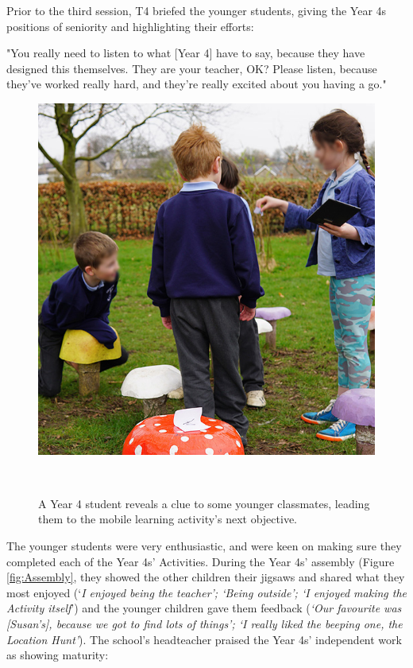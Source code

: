 Prior to the third session, T4 briefed the younger students, giving the Year 4s positions of seniority and highlighting their efforts:

\begin{displayquote}
"You really need to listen to what [Year 4] have to say, because they have designed this themselves. They are your teacher, OK? Please listen, because they've worked really hard, and they're really excited about you having a go."
\end{displayquote}

\begin{figure}
\centering
  \includegraphics[width=0.66\columnwidth]{images/chapter08/mushrooms.jpg}
  \caption[Year 4 students using OurPlace]{A Year 4 student reveals a clue to some younger classmates, leading them to the mobile learning activity's next objective. }~\label{fig:Mushrooms}
\end{figure}

The younger students were very enthusiastic, and were keen on making sure they completed each of the Year 4s' Activities. During the Year 4s' assembly (Figure \ref{fig:Assembly}, they showed the other children their jigsaws and shared what they most enjoyed (`\textit{I enjoyed being the teacher'; `Being outside'; `I enjoyed making the Activity itself}') and the younger children gave them feedback (\textit{`Our favourite was [Susan's], because we got to find lots of things'; `I really liked the beeping one, the Location Hunt'}). The school's headteacher praised the Year 4s' independent work as showing maturity: 

